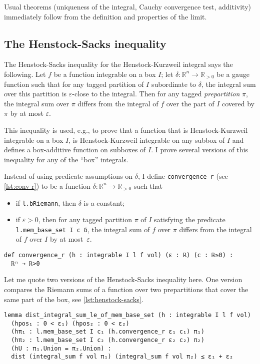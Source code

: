 \documentclass[a4paper, UKenglish,cleveref, autoref, thm-restate]{lipics-v2021}
\newcommand{\bbR}{\mathbb{R}}
\newcommand{\eps}{\varepsilon}
\begin{document}
Usual theorems (uniqueness of the integral, Cauchy convergence test,
additivity) immediately follow from the definition and properties of
the limit.

\subsection{The Henstock-Sacks inequality}%
\label{sec:henst-sacks-ineq}

The Henstock-Sacks inequality for the Henstock-Kurzweil integral says
the following. Let \(f\) be a function integrable on a box \(I\); let
\(\delta\colon \bbR^{n} \to \bbR_{>0}\) be a gauge function such that
for any tagged partition of \(I\) subordinate to \(\delta\), the
integral sum over this partition is \(\eps\)-close to the
integral. Then for any tagged \emph{prepartition} \(\pi\), the
integral sum over \(\pi\) differs from the integral of \(f\) over the
part of \(I\) covered by \(\pi\) by at most \(\eps\).

This inequality is used, e.g., to prove that a function that is
Henstock-Kurzweil integrable on a box \(I\), is Henstock-Kurzweil
integrable on any subbox of \(I\) and defines a box-additive function
on subboxes of \(I\). I prove several versions of this inequality for
any of the \enquote{box} integrals.

Instead of using predicate assumptions on \(\delta\), I define
\lstinline=convergence_r= (see \autoref{lst:conv-r}) to be a function
\(\delta\colon\mathbb R^{n}\to\mathbb R_{>0}\) such that
\begin{itemize}
\item if \lstinline=l.bRiemann=, then \(\delta\) is a constant;
\item if \(\eps > 0\), then for any tagged partition \(\pi\) of \(I\)
  satisfying the predicate \lstinline=l.mem_base_set I c δ=, the
  integral sum of \(f\) over \(\pi\) differs from the integral of
  \(f\) over \(I\) by at most~\(\eps\).
\end{itemize}

\begin{lstlisting}[caption={Gauge function that provides a witness of integrability},label=lst:conv-r]
def convergence_r (h : integrable I l f vol) (ε : ℝ) (c : ℝ≥0) :
  ℝⁿ → ℝ>0
\end{lstlisting}

Let me quote two versions of the Henstock-Sacks inequality here. One
version compares the Riemann sums of a function over two prepartitions
that cover the same part of the box, see \autoref{lst:henstock-sacks}.
\begin{lstlisting}[caption={Henstock-Sacks inequality for two integral sums},label=lst:henstock-sacks]
lemma dist_integral_sum_le_of_mem_base_set (h : integrable I l f vol)
  (hpos₁ : 0 < ε₁) (hpos₂ : 0 < ε₂)
  (hπ₁ : l.mem_base_set I c₁ (h.convergence_r ε₁ c₁) π₁)
  (hπ₂ : l.mem_base_set I c₂ (h.convergence_r ε₂ c₂) π₂)
  (hU : π₁.Union = π₂.Union) :
  dist (integral_sum f vol π₁) (integral_sum f vol π₂) ≤ ε₁ + ε₂
\end{lstlisting}
\end{document}
